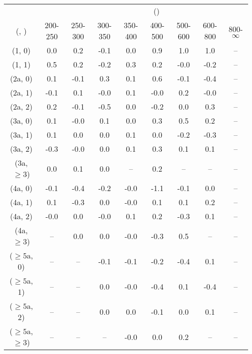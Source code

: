 \begin{table}[h!]
\tiny
\centering
{}
\begin{tabular}
{ccccccccc}
	\hline\hline
&	& \multicolumn{8}{c}{\scalht (\gev)} \\ 
	 (\njet,  \nb) & 200-250 & 250-300 & 300-350 & 350-400 & 400-500 & 500-600 & 600-800 & 800-$\infty$ \\ [0.8ex] 
\hline
	(1, 0) & 0.0 & 0.2 & -0.1 & 0.0 & 0.9 & 1.0 & 1.0 & -- \\[0.5ex] 
	(1, 1) & 0.5 & 0.2 & -0.2 & 0.3 & 0.2 & -0.0 & -0.2 & -- \\[0.5ex] 
	(2a, 0) & 0.1 & -0.1 & 0.3 & 0.1 & 0.6 & -0.1 & -0.4 & -- \\[0.5ex] 
	(2a, 1) & -0.1 & 0.1 & -0.0 & 0.1 & -0.0 & 0.2 & -0.0 & -- \\[0.5ex] 
	(2a, 2) & 0.2 & -0.1 & -0.5 & 0.0 & -0.2 & 0.0 & 0.3 & -- \\[0.5ex] 
	(3a, 0) & 0.1 & -0.0 & 0.1 & 0.0 & 0.3 & 0.5 & 0.2 & -- \\[0.5ex] 
	(3a, 1) & 0.1 & 0.0 & 0.0 & 0.1 & 0.0 & -0.2 & -0.3 & -- \\[0.5ex] 
	(3a, 2) & -0.3 & -0.0 & 0.0 & 0.1 & 0.3 & 0.1 & 0.1 & -- \\[0.5ex] 
	(3a, $\ge3$) & 0.0 & 0.1 & 0.0 & -- & 0.2 & -- & -- & -- \\[0.5ex] 
	(4a, 0) & -0.1 & -0.4 & -0.2 & -0.0 & -1.1 & -0.1 & 0.0 & -- \\[0.5ex] 
	(4a, 1) & 0.1 & -0.3 & 0.0 & -0.0 & 0.1 & 0.1 & 0.2 & -- \\[0.5ex] 
	(4a, 2) & -0.0 & 0.0 & -0.0 & 0.1 & 0.2 & -0.3 & 0.1 & -- \\[0.5ex] 
	(4a, $\ge3$) & -- & 0.0 & 0.0 & -0.0 & -0.3 & 0.5 & -- & -- \\[0.5ex] 
	($\ge5$a, 0) & -- & -- & -0.1 & -0.1 & -0.2 & -0.4 & 0.1 & -- \\[0.5ex] 
	($\ge5$a, 1) & -- & -- & 0.0 & -0.0 & -0.4 & 0.1 & -0.4 & -- \\[0.5ex] 
	($\ge5$a, 2) & -- & -- & 0.0 & 0.0 & -0.1 & 0.0 & 0.1 & -- \\[0.5ex] 
	($\ge5$a, $\ge3$) & -- & -- & -- & -0.0 & 0.0 & 0.2 & -- & -- \\[0.5ex] 
	\hline
	\hline
\end{tabular}
\end{table}
